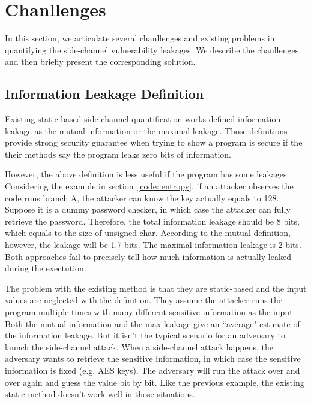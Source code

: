 \section{Chanllenges}

In this section, we articulate several chanllenges and existing problems
in quantifying the side-channel vulnerability leakages. We describe the
chanllenges and then briefly present the corresponding solution.

\subsection{Information Leakage Definition}
Existing static-based side-channel quantification works defined information leakage
as the mutual information or the maximal leakage. Those definitions provide strong security guarantee
when trying to show a program is secure if the their methods say the program leaks zero bits of
information.


However, the above definition is less useful if the program has some leakages. 
Considering the example in section~\ref{code::entropy}, if an attacker observes the
code runs branch A, the attacker can know the key actually equals to 128. Suppose it is 
a dummy password checker, in which case the attacker can fully retrieve the password.
Therefore, the total information leakage should be 8 bits, which equals to the size
of unsigned char. 
According to the mutual definition, however, the leakage will be 1.7 bits. The maximal information
leakage is 2 bits. Both approaches fail to precisely tell how much information is actually leaked
during the exectution.

The problem with the existing method is that they are static-based and the 
input values are neglected with the definition. 
They assume the attacker runs the program multiple times with many different sensitive 
information as the input. Both the mutual information and the max-leakage give an ``average" 
estimate of the information leakage. But it isn't the typical scenario for an adversary to 
launch the side-channel attack. When a side-channel attack happens, the adversary wants 
to retrieve the sensitive information, in which case the sensitive information is fixed (e.g. AES keys). 
The adversary will run the attack over and over again and guess the value bit by bit. Like the 
previous example, the existing static method doesn’t work well in those situations.


